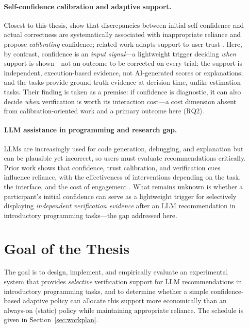 \documentclass[oneside,final,14pt,a4paper]{extreport}
\begin{document}
\paragraph{Self-confidence calibration and adaptive support.}
Closest to this thesis, \cite{ToRelyOrNotToRely2024} show that discrepancies
between initial self-confidence and actual correctness are systematically
associated with inappropriate reliance and propose \emph{calibrating}
confidence; related work adapts support to user trust
\cite{Xie2025AdjustForTrust}. Here, by contrast, confidence is an \emph{input
signal}---a lightweight trigger deciding \emph{when} support is shown---not an
outcome to be corrected on every trial; the support is independent,
execution-based evidence, not AI-generated scores or explanations; and the
tasks provide ground-truth evidence at decision time, unlike estimation tasks.
Their finding is taken as a premise: if confidence is diagnostic, it can also
decide \emph{when} verification is worth its interaction cost---a cost
dimension absent from calibration-oriented work and a primary outcome here
(RQ2).

\paragraph{LLM assistance in programming and research gap.}
LLMs are increasingly used for code generation, debugging, and explanation
\cite{Ma2023,Cambaz2024} but can be plausible yet incorrect, so users must
evaluate recommendations critically. Prior work shows that confidence, trust
calibration, and verification cues influence reliance, with the effectiveness
of interventions depending on the task, the interface, and the cost of
engagement \cite{Vasconcelos2023}. What remains unknown is whether a
participant's initial confidence can serve as a lightweight trigger for
selectively displaying \emph{independent verification evidence} after an LLM
recommendation in introductory programming tasks---the gap addressed here.

\section{Goal of the Thesis}

The goal is to design, implement, and empirically evaluate an experimental
system that provides \emph{selective} verification support for LLM
recommendations in introductory programming tasks, and to determine whether a
simple confidence-based adaptive policy can allocate this support more
economically than an always-on (static) policy while maintaining appropriate
reliance. The schedule is given in Section~\ref{sec:workplan}.
\end{document}
